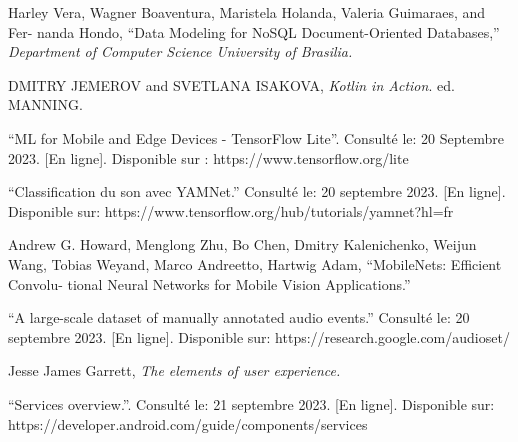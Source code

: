 \noindent [14] Harley Vera, Wagner Boaventura, Maristela Holanda, Valeria Guimaraes, and Fer-
nanda Hondo, “Data Modeling for NoSQL Document-Oriented Databases,” \textit{Department of Computer Science University of Brasilia.}

\noindent [15] DMITRY JEMEROV and SVETLANA ISAKOVA, \textit{Kotlin in Action}. ed. MANNING.

\noindent [16] “ML for Mobile and Edge Devices - TensorFlow Lite”. Consulté le: 20 Septembre 2023. [En ligne]. Disponible sur : https://www.tensorflow.org/lite

\noindent [17] “Classification du son avec YAMNet.” Consulté le: 20 septembre 2023. [En ligne]. Disponible sur: https://www.tensorflow.org/hub/tutorials/yamnet?hl=fr

\noindent [18] Andrew G. Howard, Menglong Zhu, Bo Chen, Dmitry Kalenichenko, Weijun Wang,
Tobias Weyand, Marco Andreetto, Hartwig Adam, “MobileNets: Efficient Convolu-
tional Neural Networks for Mobile Vision Applications.”

\noindent [19] “A large-scale dataset of manually annotated audio events.” Consulté le: 20 septembre 2023. [En ligne]. Disponible sur: https://research.google.com/audioset/

\noindent [20] Jesse James Garrett, \textit{The elements of user experience.}

\noindent [21] “Services overview.”. Consulté le: 21 septembre 2023. [En ligne]. Disponible sur: https://developer.android.com/guide/components/services